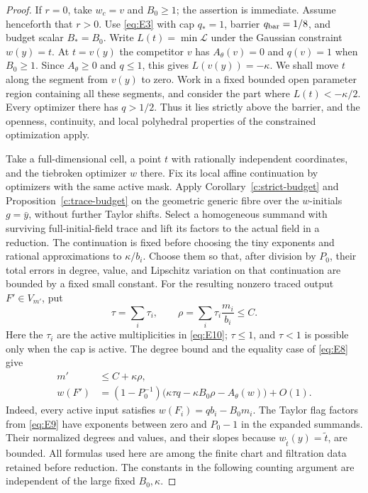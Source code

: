 \begin{proof}
If $r=0$, take $w_c=v$ and $B_0\ge1$; the assertion is immediate.
Assume henceforth that $r>0$.  Use \eqref{eq:E3} with cap $q_*=1$, barrier $q_{\rm bar}=1/8$,
and budget scalar $B_*=B_0$.  Write
$L(t)=\min\mathcal L$ under the Gaussian constraint $w(y)=t$.
At $t=v(y)$ the competitor $v$ has $A_\theta(v)=0$ and $q(v)=1$
when $B_0\ge1$.  Since $A_\theta\ge0$ and $q\le1$, this gives
$L(v(y))=-\kappa$.  We shall move $t$ along the segment from $v(y)$
to zero.  Work in a fixed bounded open parameter region containing
all these segments, and consider the part where $L(t)<-\kappa/2$.
Every optimizer there has $q>1/2$.  Thus it lies strictly above
the barrier, and the openness, continuity, and local polyhedral
properties of the constrained optimization apply.

Take a full-dimensional cell, a point $t$ with rationally independent
coordinates, and the tiebroken optimizer $w$ there.  Fix its local
affine continuation by optimizers with the same active mask.
Apply Corollary~\ref{c:strict-budget} and
Proposition~\ref{c:trace-budget} on the
geometric generic fibre over the $w$-initials $g=\bar y$,
without further Taylor
shifts.  Select a homogeneous summand with surviving full-initial-field
trace and lift its factors to the actual field in a reduction.
The continuation is fixed before choosing the tiny exponents and
rational approximations to $\kappa/b_i$.  Choose them so that, after
division by $P_0$, their total errors in degree, value, and Lipschitz
variation on that continuation are bounded by a fixed small constant.
For the resulting nonzero traced output $F'\in V_{m'}$, put
\[
 \tau=\sum_i\tau_i,\qquad
 \rho=\sum_i\tau_i\frac{m_i}{b_i}\le C.
\]
Here the $\tau_i$ are the active multiplicities in \eqref{eq:E10};
$\tau\le1$, and $\tau<1$ is possible only when the cap is active.
The degree bound and the equality case of \eqref{eq:E8} give
\begin{equation}\label{eq:F1}
 \begin{split}
 m'&\le C+\kappa\rho,\\
 w(F')&=(1-P_0^{-1})
       \bigl(\kappa\tau q-\kappa B_0\rho-A_\theta(w)\bigr)+O(1).
 \end{split}
\end{equation}
Indeed, every active input satisfies
$w(F_i)=qb_i-B_0m_i$.  The Taylor flag factors from \eqref{eq:E9}
have exponents between zero and $P_0-1$ in the expanded summands.
Their normalized degrees and values, and their slopes because
$w_{\widetilde t}(y)=\widetilde t$, are bounded.  All formulas used
here are among the finite chart and filtration data retained before
reduction.  The constants in the following counting argument are
independent of the large fixed $B_0,\kappa$.


\end{proof}
